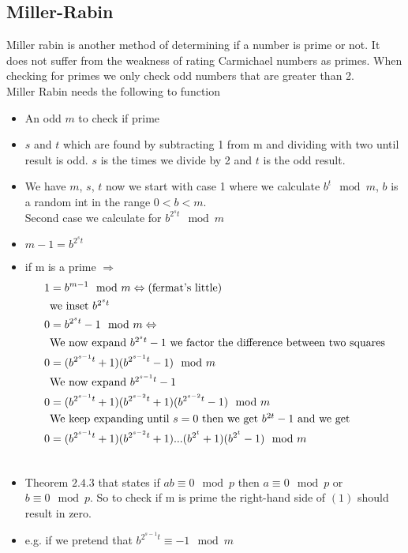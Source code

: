 \subsection{Miller-Rabin}
Miller rabin is another method of determining if a number is prime or not. It does not suffer from the weakness of rating Carmichael numbers as primes. When checking for primes we only check odd numbers that are greater than 2.\\
Miller Rabin needs the following to function
\begin{itemize}
\item An odd $m$ to check if prime
\item $s$ and $t$ which are found by subtracting 1 from m and dividing with two until result is odd. $s$ is the times we divide by 2 and $t$ is the odd result.
\item We have $m$, $s$, $t$ now we start with case 1 where we calculate $b^t\mod m$, $b$ is a random int in the range $0<b<m$.\\
Second case we calculate for $b^{2^st}\mod m$
\item $m-1=b^{2^st}$ 
\item if m is a prime $\Rightarrow$
\begin{align}
1&=b^{m-1}\mod m \Leftrightarrow\mbox{(fermat's little)}\notag\\
&\mbox{we inset $b^{2^st}$}\notag\\
0&=b^{2^st}-1\mod m \Leftrightarrow\notag\\
&\mbox{We now expand $b^{2^st}-1$ we factor the difference between two squares}\notag \\
0&=(b^{2^{s-1}t}+1)(b^{2^{s-1}t}-1)\mod m\notag\\
&\mbox{We now expand $b^{2^{s-1}t}-1$}\notag\\
0&=(b^{2^{s-1}t}+1)(b^{2^{s-2}t}+1)(b^{2^{s-2}t}-1)\mod m\notag\\
&\mbox{We keep expanding until $s=0$ then we get $b^{2t}-1$ and we get}\notag\\
0&=(b^{2^{s-1}t}+1)(b^{2^{s-2}t}+1)...(b^{2^t}+1)(b^{2^t}-1)\mod m\\
\notag
\end{align}
\item Theorem $2.4.3$ that states if $ab\equiv 0 \mod p$ then $a\equiv 0 \mod p$ or $b\equiv 0 \mod p$. So to check if m is prime the right-hand side of $(1)$ should result in zero.
\item e.g. if we pretend that $b^{2^{s-1}t}\equiv -1 \mod m$
\begin{align*}

\end{align*}
\end{itemize}
